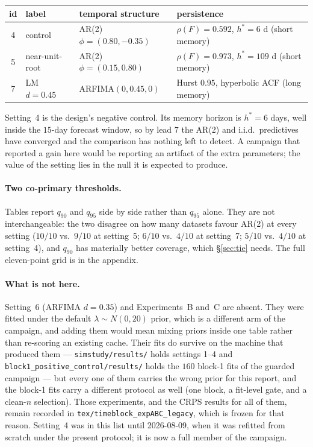 \documentclass[11pt]{article}
\newcommand{\code}[1]{\texttt{#1}}
\begin{document}
\begin{center}
\small
\begin{tabular}{clll}
\toprule
id & label & temporal structure & persistence \\
\midrule
4 & control & AR(2) $\phi = (0.80, -0.35)$ & $\rho(F) = 0.592$,
$h^\ast = 6$ d (short memory) \\
5 & near-unit-root & AR(2) $\phi = (0.15, 0.80)$ & $\rho(F) = 0.973$,
$h^\ast = 109$ d (short memory) \\
7 & LM $d = 0.45$ & ARFIMA$(0, 0.45, 0)$ & Hurst $0.95$, hyperbolic ACF
(long memory) \\
\bottomrule
\end{tabular}
\end{center}

\noindent Setting~4 is the design's negative control. Its memory horizon
is $h^\ast = 6$ days, well inside the $15$-day forecast window, so by
lead $7$ the AR(2) and i.i.d.\ predictives have converged and the
comparison has nothing left to detect. A campaign that reported a gain
here would be reporting an artifact of the extra parameters; the value of
the setting lies in the null it is expected to produce.

\paragraph{Two co-primary thresholds.} Tables report $q_{90}$ and
$q_{95}$ side by side rather than $q_{95}$ alone. They are not
interchangeable: the two disagree on how many datasets favour AR(2) at
every setting ($10/10$ vs.\ $9/10$ at setting~5; $6/10$ vs.\ $4/10$ at
setting~7; $5/10$ vs.\ $4/10$ at setting~4), and $q_{90}$ has materially
better coverage, which \S\ref{sec:tie} needs. The full eleven-point grid
is in the appendix.

\paragraph{What is not here.} Setting~6 (ARFIMA $d = 0.35$) and
Experiments~B and~C are absent. They were fitted under the default
$\lambda \sim N(0, 20)$ prior, which is a different arm of the campaign,
and adding them would mean mixing priors inside one table rather than
re-scoring an existing cache. Their fits do survive on the machine that
produced them --- \code{simstudy/results/} holds settings 1--4 and
\code{block1\_positive\_control/results/} holds the $160$ block-1 fits of
the guarded campaign --- but every one of them carries the wrong prior for
this report, and the block-1 fits carry a different protocol as well
(one block, a fit-level gate, and a clean-$n$ selection). Those
experiments, and the CRPS results for all of them, remain recorded in
\code{tex/timeblock\_expABC\_legacy}, which is frozen for that reason.
Setting~4 was in this list until 2026-08-09, when it was refitted from
scratch under the present protocol; it is now a full member of the
campaign.
\end{document}
